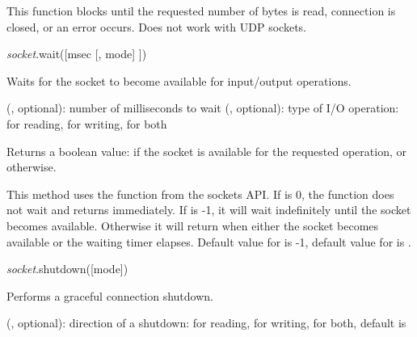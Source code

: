 \documentclass[a4paper,12pt,twoside,extrafontsizes]{memoir}
\begin{document}
\begin{funcremarks}
	This function blocks until the requested number of bytes is read, connection is closed, or an error occurs. Does not work with UDP sockets.
\end{funcremarks}


\begin{luafuncprototype}
	\emph{socket}.wait([msec [, mode] ])
\end{luafuncprototype}

\begin{funcdescr}
	Waits for the socket to become available for input/output operations.
\end{funcdescr}

\begin{funcparams}
	 (, optional): number of milliseconds to wait
	 (, optional): type of I/O operation:  for reading,  for writing,  for both
\end{funcparams}

\begin{funcret}
	Returns a boolean value:  if the socket is available for the requested operation, or  otherwise.
\end{funcret}

\begin{funcremarks}
	This method uses the  function from the sockets API. If  is 0, the function does not wait and returns immediately. If  is -1, it will wait indefinitely until the socket becomes available. Otherwise it will return when either the socket becomes available or the waiting timer elapses.
	Default value for  is -1, default value for  is .
\end{funcremarks}


\begin{luafuncprototype}
	\emph{socket}.shutdown([mode])
\end{luafuncprototype}

\begin{funcdescr}
	Performs a graceful connection shutdown.
\end{funcdescr}

\begin{funcparams}
	 (, optional): direction of a shutdown:  for reading,  for writing,  for both, default is 
\end{funcparams}
\end{document}
